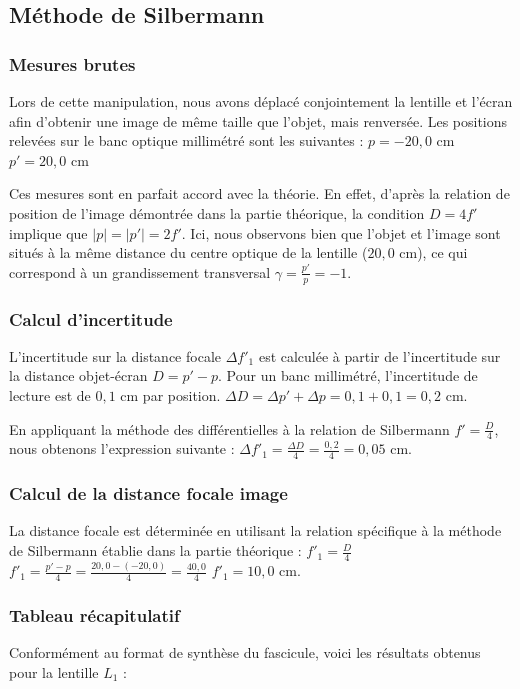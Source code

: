 \subsection{Méthode de Silbermann}

\subsubsection{Mesures brutes}
Lors de cette manipulation, 
nous avons déplacé conjointement la lentille et l'écran 
afin d'obtenir une image de même taille que l'objet, mais renversée. 
Les positions relevées sur le banc optique millimétré sont les suivantes :
$p = -20{,}0 \text{ cm}$
$p' = 20{,}0 \text{ cm}$

Ces mesures sont en parfait accord avec la théorie. 
En effet, d'après la relation de position de l'image démontrée dans la partie théorique, 
la condition $D=4f'$ implique que $|p| = |p'| = 2f'$. 
Ici, nous observons bien que l'objet et l'image 
sont situés à la même distance du centre optique de la lentille ($20{,}0 \text{ cm}$), 
ce qui correspond à un grandissement transversal $\gamma = \frac{p'}{p} = -1$.

\subsubsection{Calcul d'incertitude}
L'incertitude sur la distance focale $\Delta f'_1$ est calculée 
à partir de l'incertitude sur la distance objet-écran $D = p' - p$.
Pour un banc millimétré, l'incertitude de lecture est de $0{,}1 \text{ cm}$ par position.
$\Delta D = \Delta p' + \Delta p = 0{,}1 + 0{,}1 = 0{,}2 \text{ cm}$.

En appliquant la méthode des différentielles à la relation de Silbermann $f' = \frac{D}{4}$, 
nous obtenons l'expression suivante :
$\Delta f'_1 = \frac{\Delta D}{4} = \frac{0{,}2}{4} = 0{,}05 \text{ cm}$.

\subsubsection{Calcul de la distance focale image}
La distance focale est déterminée en utilisant la relation spécifique 
à la méthode de Silbermann établie dans la partie théorique :
$f'_1 = \frac{D}{4}$
$f'_1 = \frac{p' - p}{4} = \frac{20{,}0 - (-20{,}0)}{4} = \frac{40{,}0}{4}$
$f'_1 = 10{,}0 \text{ cm}$.

\subsubsection{Tableau récapitulatif}
Conformément au format de synthèse du fascicule, 
voici les résultats obtenus pour la lentille $L_1$ :

